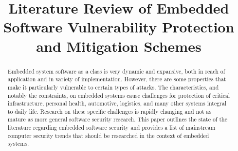 \documentclass[final,conference,11pt]{IEEEtran}
\begin{document}
%
\title{Literature Review of Embedded Software Vulnerability Protection and Mitigation Schemes}

\author{
}

\maketitle


\begin{abstract}
Embedded system software as a class is very dynamic and expansive, both in reach of application and in variety of implementation.  However, there are some properties that make it particularly vulnerable to certain types of attacks.  The characteristics, and notably the constraints, on embedded systems cause challenges for protection of critical infrastructure, personal health, automotive, logistics, and many other systems integral to daily life. Research on these specific challenges is rapidly changing and not as mature as more general software security research.  This paper outlines the state of the literature regarding embedded software security and provides a list of mainstream computer security trends that should be researched in the context of embedded systems.

\end{abstract}
\end{document}
